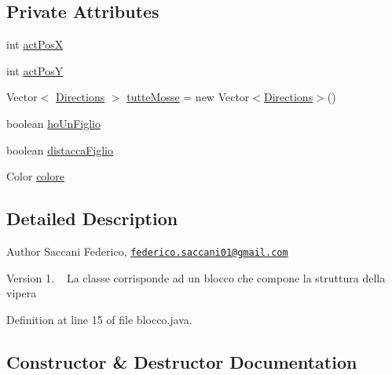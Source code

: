 \subsection*{Private Attributes}
\begin{DoxyCompactItemize}
\item 
int \mbox{\hyperlink{class_snake_1_1game_1_1vipera_1_1blocco_aaa64105e6cedf2b98a63e3ab8c8f4cdb}{act\+PosX}}
\item 
int \mbox{\hyperlink{class_snake_1_1game_1_1vipera_1_1blocco_a301b22c6bff25f4530e3f991788338fe}{act\+PosY}}
\item 
Vector$<$ \mbox{\hyperlink{enum_snake_1_1game_1_1utility_1_1_directions}{Directions}} $>$ \mbox{\hyperlink{class_snake_1_1game_1_1vipera_1_1blocco_a0670f48287135d82c64441e965d35c18}{tutte\+Mosse}} = new Vector$<$\mbox{\hyperlink{enum_snake_1_1game_1_1utility_1_1_directions}{Directions}}$>$()
\item 
boolean \mbox{\hyperlink{class_snake_1_1game_1_1vipera_1_1blocco_a909ed9e20b51021224373cb7e95365e7}{ho\+Un\+Figlio}}
\item 
boolean \mbox{\hyperlink{class_snake_1_1game_1_1vipera_1_1blocco_aab706c0c0218d17f9386c9dce8989195}{distacca\+Figlio}}
\item 
Color \mbox{\hyperlink{class_snake_1_1game_1_1vipera_1_1blocco_ada0bf0be39e4ad9d58f6e7c48f14c64a}{colore}}
\end{DoxyCompactItemize}


\subsection{Detailed Description}
\begin{DoxyAuthor}{Author}
Saccani Federico, \href{mailto:federico.saccani01@gmail.com}{\tt federico.\+saccani01@gmail.\+com} 
\end{DoxyAuthor}
\begin{DoxyVersion}{Version}
1. ~\newline
La classe corrisponde ad un blocco che compone la struttura della vipera 
\end{DoxyVersion}


Definition at line 15 of file blocco.\+java.



\subsection{Constructor \& Destructor Documentation}
\mbox{\label{class_snake_1_1game_1_1vipera_1_1blocco_a0143d1efd3c540135c872d58b6b2870d}} 
